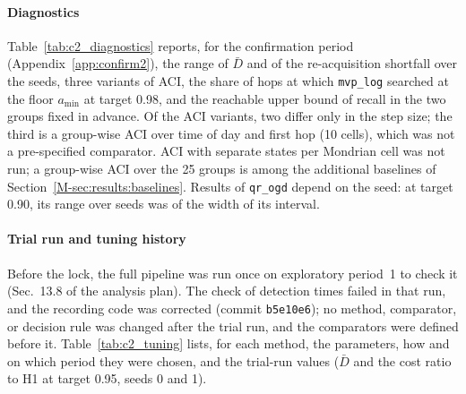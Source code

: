 \paragraph*{Diagnostics}
Table~\ref{tab:c2_diagnostics} reports, for the confirmation period
(Appendix~\ref{app:confirm2}), the range of $\bar{D}$ and of the re-acquisition
shortfall over the \ctwoNumSeeds{} seeds, three variants of ACI, the share of hops
at which \texttt{mvp\_log} searched at the floor $a_{\min}$ at target 0.98, and
the reachable upper bound of recall in the two groups fixed in advance. Of the
ACI variants, two differ only in the step size; the third is a group-wise ACI
over time of day and first hop (10 cells), which was not a pre-specified
comparator. ACI with separate states per Mondrian cell was not run; a group-wise
ACI over the 25 groups is among the additional baselines of
Section~\ref{M-sec:results:baselines}. Results of \texttt{qr\_ogd} depend on the
seed: at target 0.90, its range over seeds was \ctwoQrOgdSeedSpreadRatio{} of the
width of its interval.

\begin{table}[!htbp]
\centering
\caption{Diagnostics on the confirmation period. Range over seeds of $\bar{D}$
and of the re-acquisition shortfall (pp) and its ratio to the interval width;
three ACI variants ($\gamma=0.0005$; $\gamma=0.001$; group-wise ACI over time of
day $\times$ first hop with $\gamma=0.001$ and floor $\alpha/5$), means over
seeds and blocks without intervals; share of hops at $a_{\min}$ for
\texttt{mvp\_log} at target 0.98; reachable upper bound of recall in the
re-acquisition and isolation~Q4 groups, both blocks pooled.}
\label{tab:c2_diagnostics}
\footnotesize
{}
\end{table}

\paragraph*{Trial run and tuning history}
Before the lock, the full pipeline was run once on exploratory period~1 to check
it (Sec.~13.8 of the analysis plan). The check of detection times failed in that run, and the
recording code was corrected (commit \texttt{b5e10e6}); no method, comparator, or
decision rule was changed after the trial run, and the comparators were defined
before it. Table~\ref{tab:c2_tuning} lists, for each method, the parameters, how
and on which period they were chosen, and the trial-run values ($\bar{D}$ and the
cost ratio to H1 at target 0.95, seeds 0 and 1).

